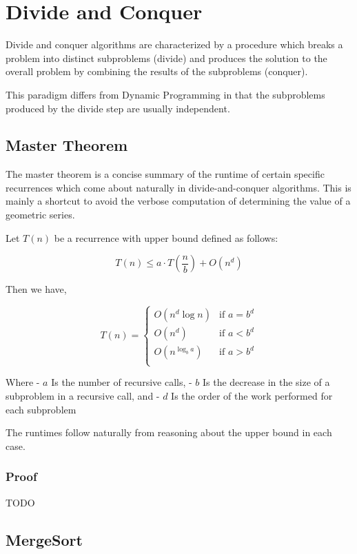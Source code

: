 \documentclass{standalone}
\begin{document}
\section{Divide and Conquer}

Divide and conquer algorithms are characterized by a procedure which breaks a
problem into distinct subproblems (divide) and produces the solution to the
overall problem by combining the results of the subproblems (conquer).

This paradigm differs from Dynamic Programming in that the subproblems produced
by the divide step are usually independent.

\subsection{Master Theorem}

The master theorem is a concise summary of the runtime of certain specific
recurrences which come about naturally in divide-and-conquer algorithms. This is
mainly a shortcut to avoid the verbose computation of determining the value of
a geometric series.

Let $T(n)$ be a recurrence with upper bound defined as follows:

\[
  T(n) \leqslant a \cdot T(\frac n b) + O(n^d)
\]

Then we have,

\[
  T(n) =
  \begin{cases}
    O(n^d \log n) & \text{if $a = b^d$} \\
    O(n^d) & \text{if $a < b^d$} \\
    O(n^{\log_b a}) & \text{if $a > b^d$} \\
  \end{cases}
\]

Where
- $a$ Is the number of recursive calls,
- $b$ Is the decrease in the size of a subproblem in a recursive call, and
- $d$ Is the order of the work performed for each subproblem

The runtimes follow naturally from reasoning about the upper bound in each case.

\subsubsection{Proof}

TODO

\subsection{MergeSort}
\end{document}
